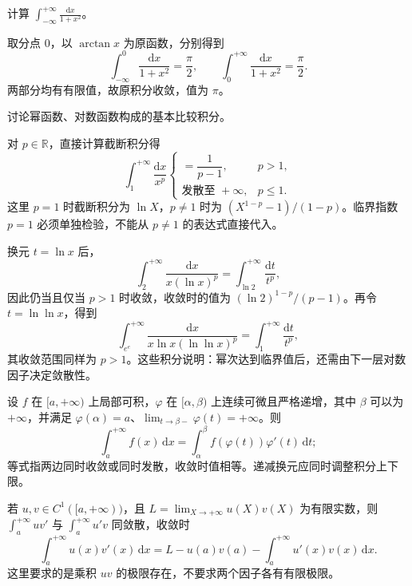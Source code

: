 \begin{example}
\label{ex:improper-integral-arctangent}
计算 $\int_{-\infty}^{+\infty}\frac{\mathrm{d}x}{1+x^2}$。
\end{example}

\begin{solve}
取分点 $0$，以 $\arctan x$ 为原函数，分别得到
\[
    \int_{-\infty}^0\frac{\mathrm{d}x}{1+x^2}=\frac\pi2,
    \qquad
    \int_0^{+\infty}\frac{\mathrm{d}x}{1+x^2}=\frac\pi2.
\]
两部分均有有限值，故原积分收敛，值为 $\pi$。
\end{solve}

\begin{example}
\label{ex:improper-power-and-log-benchmarks}
讨论幂函数、对数函数构成的基本比较积分。
\end{example}

\begin{solve}
对 $p\in\mathbb{R}$，直接计算截断积分得
\begin{equation}
    \int_1^{+\infty}\frac{\mathrm{d}x}{x^p}
    \begin{cases}
        =\dfrac1{p-1},&p>1,\\
        \text{发散至 }+\infty,&p\leq1.
    \end{cases}
    \label{eq:infinite-power-integral-benchmark}
\end{equation}
这里 $p=1$ 时截断积分为 $\ln X$，$p\neq1$ 时为 $(X^{1-p}-1)/(1-p)$。临界指数 $p=1$ 必须单独检验，不能从 $p\neq1$ 的表达式直接代入。

换元 $t=\ln x$ 后，
\[
    \int_2^{+\infty}\frac{\mathrm{d}x}{x(\ln x)^p}
    =\int_{\ln2}^{+\infty}\frac{\mathrm{d}t}{t^p},
\]
因此仍当且仅当 $p>1$ 时收敛，收敛时的值为 $(\ln2)^{1-p}/(p-1)$。再令 $t=\ln\ln x$，得到
\[
    \int_{e^e}^{+\infty}
        \frac{\mathrm{d}x}{x\ln x(\ln\ln x)^p}
    =\int_1^{+\infty}\frac{\mathrm{d}t}{t^p},
\]
其收敛范围同样为 $p>1$。这些积分说明：幂次达到临界值后，还需由下一层对数因子决定敛散性。
\end{solve}

\begin{proposition}[换元与分部积分]
\label{prop:improper-substitution-and-parts}
设 $f$ 在 $[a,+\infty)$ 上局部可积，$\varphi$ 在 $[\alpha,\beta)$ 上连续可微且严格递增，其中 $\beta$ 可以为 $+\infty$，并满足 $\varphi(\alpha)=a$、$\lim_{t\to\beta-}\varphi(t)=+\infty$。则
\begin{equation}
    \int_a^{+\infty}f(x)\,\mathrm{d}x
    =\int_\alpha^\beta f(\varphi(t))\varphi'(t)\,\mathrm{d}t;
    \label{eq:improper-substitution}
\end{equation}
等式指两边同时收敛或同时发散，收敛时值相等。递减换元应同时调整积分上下限。

若 $u,v\in C^1([a,+\infty))$，且 $L=\lim_{X\to+\infty}u(X)v(X)$ 为有限实数，则 $\int_a^{+\infty}uv'$ 与 $\int_a^{+\infty}u'v$ 同敛散，收敛时
\begin{equation}
    \int_a^{+\infty}u(x)v'(x)\,\mathrm{d}x
    =L-u(a)v(a)-\int_a^{+\infty}u'(x)v(x)\,\mathrm{d}x.
    \label{eq:improper-integration-by-parts}
\end{equation}
这里要求的是乘积 $uv$ 的极限存在，不要求两个因子各有有限极限。
\end{proposition}

